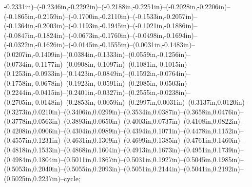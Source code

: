 -0.2331in)--(-0.2346in,-0.2292in)--(-0.2188in,-0.2251in)--(-0.2028in,-0.2206in)--(-0.1865in,-0.2159in)--(-0.1700in,-0.2110in)--(-0.1533in,-0.2057in)--(-0.1364in,-0.2003in)--(-0.1193in,-0.1945in)--(-0.1021in,-0.1886in)--(-0.0847in,-0.1824in)--(-0.0673in,-0.1760in)--(-0.0498in,-0.1694in)--(-0.0322in,-0.1626in)--(-0.0145in,-0.1555in)--(0.0031in,-0.1483in)--(0.0207in,-0.1409in)--(0.0384in,-0.1333in)--(0.0559in,-0.1256in)--(0.0734in,-0.1177in)--(0.0908in,-0.1097in)--(0.1081in,-0.1015in)--(0.1253in,-0.0933in)--(0.1423in,-0.0849in)--(0.1592in,-0.0764in)--(0.1758in,-0.0678in)--(0.1923in,-0.0591in)--(0.2085in,-0.0503in)--(0.2244in,-0.0415in)--(0.2401in,-0.0327in)--(0.2555in,-0.0238in)--(0.2705in,-0.0148in)--(0.2853in,-0.0059in)--(0.2997in,0.0031in)--(0.3137in,0.0120in)--(0.3273in,0.0210in)--(0.3406in,0.0299in)--(0.3534in,0.0387in)--(0.3658in,0.0476in)--(0.3778in,0.0563in)--(0.3893in,0.0650in)--(0.4003in,0.0737in)--(0.4108in,0.0822in)--(0.4208in,0.0906in)--(0.4304in,0.0989in)--(0.4394in,0.1071in)--(0.4478in,0.1152in)--(0.4557in,0.1231in)--(0.4631in,0.1309in)--(0.4699in,0.1385in)--(0.4761in,0.1460in)--(0.4818in,0.1533in)--(0.4868in,0.1604in)--(0.4913in,0.1673in)--(0.4951in,0.1739in)--(0.4984in,0.1804in)--(0.5011in,0.1867in)--(0.5031in,0.1927in)--(0.5045in,0.1985in)--(0.5053in,0.2040in)--(0.5055in,0.2093in)--(0.5051in,0.2144in)--(0.5041in,0.2192in)--(0.5025in,0.2237in)--cycle;
